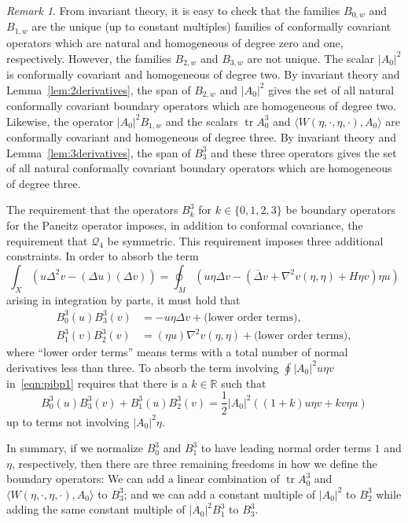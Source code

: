 \documentclass{amsart}
\theoremstyle{definition}
\theoremstyle{remark}
\newtheorem{remark}[thm]{Remark}
\numberwithin{equation}{section}
\begin{document}
\begin{remark}
 \label{rk:uniqueness}
 From invariant theory, it is easy to check that the families $B_{0,w}$ and $B_{1,w}$ are the unique (up to constant multiples) families of conformally covariant operators which are natural and homogeneous of degree zero and one, respectively.  However, the families $B_{2,w}$ and $B_{3,w}$ are not unique.  The scalar ${\lvert} A_0{\rvert}^2$ is conformally covariant and homogeneous of degree two.  By invariant theory and Lemma~\ref{lem:2derivatives}, the span of $B_{2,w}$ and ${\lvert} A_0{\rvert}^2$ gives the set of all natural conformally covariant boundary operators which are homogeneous of degree two.  Likewise, the operator ${\lvert} A_0{\rvert}^2B_{1,w}$ and the scalars $\operatorname{tr} A_0^3$ and ${\langle} W(\eta,\cdot,\eta,\cdot),A_0{\rangle}$ are conformally covariant and homogeneous of degree three.  By invariant theory and Lemma~\ref{lem:3derivatives}, the span of $B_3^3$ and these three operators gives the set of all natural conformally covariant boundary operators which are homogeneous of degree three.

 The requirement that the operators $B_k^3$ for $k\in\{0,1,2,3\}$ be boundary operators for the Paneitz operator imposes, in addition to conformal covariance, the requirement that ${\mathcal{Q}}_4$ be symmetric.  This requirement imposes three additional constraints.  In order to absorb the term
 \[ \int_X \left( u\Delta^2v - (\Delta u)(\Delta v)\right) = \oint_M \left( u\eta\Delta v - ({\overline{\Delta}} v + \nabla^2v(\eta,\eta) + H\eta v)\eta u\right) \]
 arising in integration by parts, it must hold that
 \begin{align*}
  B_0^3(u)B_3^3(v) & = -u\eta\Delta v + \text{(lower order terms)}, \\
  B_1^3(v)B_2^3(v) & = (\eta u)\nabla^2v(\eta,\eta) + \text{(lower order terms)},
 \end{align*}
 where ``lower order terms'' means terms with a total number of normal derivatives less than three.  To absorb the term involving $\oint{\lvert} A_0{\rvert}^2u\eta v$ in~\eqref{eqn:pibp1} requires that there is a $k\in{\mathbb{R}}$ such that
 \[ B_0^3(u)B_3^3(v) + B_1^3(u)B_2^3(v) = \frac{1}{2}{\lvert} A_0{\rvert}^2\left((1+k)u\eta v + kv\eta u\right) \]
 up to terms not involving ${\lvert} A_0{\rvert}^2\eta$.

 In summary, if we normalize $B_0^3$ and $B_1^3$ to have leading normal order terms $1$ and $\eta$, respectively, then there are three remaining freedoms in how we define the boundary operators: We can add a linear combination of $\operatorname{tr} A_0^3$ and ${\langle} W(\eta,\cdot,\eta,\cdot),A_0{\rangle}$ to $B_3^3$; and we can add a constant multiple of ${\lvert} A_0{\rvert}^2$ to $B_2^3$ while adding the same constant multiple of ${\lvert} A_0{\rvert}^2B_1^3$ to $B_3^3$.
\end{remark}
\end{document}
